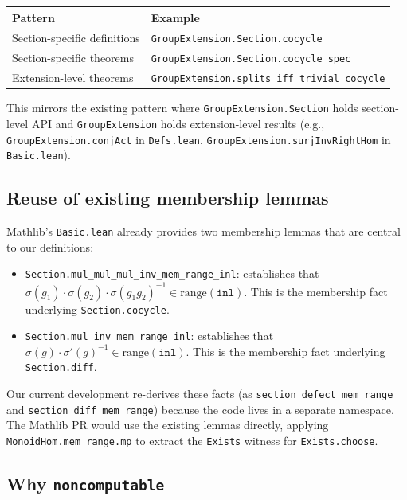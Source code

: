 \documentclass[11pt]{article}
\begin{document}
\begin{center}
\begin{tabular}{ll}
\toprule
\textbf{Pattern} & \textbf{Example} \\
\midrule
Section-specific definitions & \texttt{GroupExtension.Section.cocycle} \\
Section-specific theorems & \texttt{GroupExtension.Section.cocycle\_spec} \\
Extension-level theorems & \texttt{GroupExtension.splits\_iff\_trivial\_cocycle} \\
\bottomrule
\end{tabular}
\end{center}

This mirrors the existing pattern where \texttt{GroupExtension.Section} holds
section-level API and \texttt{GroupExtension} holds extension-level results (e.g.,
\texttt{GroupExtension.conjAct} in \texttt{Defs.lean},
\texttt{GroupExtension.surjInvRightHom} in \texttt{Basic.lean}).

\subsection{Reuse of existing membership lemmas}\label{sec:reuse}

Mathlib's \texttt{Basic.lean} already provides two membership lemmas that are central
to our definitions:

\begin{itemize}[nosep]
\item \texttt{Section.mul\_mul\_mul\_inv\_mem\_range\_inl}: establishes that
  $\sigma(g_1) \cdot \sigma(g_2) \cdot \sigma(g_1 g_2)^{-1} \in
  \mathrm{range}(\texttt{inl})$. This is the membership fact underlying
  \texttt{Section.cocycle}.

\item \texttt{Section.mul\_inv\_mem\_range\_inl}: establishes that
  $\sigma(g) \cdot \sigma'(g)^{-1} \in \mathrm{range}(\texttt{inl})$. This is the
  membership fact underlying \texttt{Section.diff}.
\end{itemize}

Our current development re-derives these facts (as \texttt{section\_defect\_mem\_range}
and \texttt{section\_diff\_mem\_range}) because the code lives in a separate namespace.
The Mathlib PR would use the existing lemmas directly, applying
\texttt{MonoidHom.mem\_range.mp} to extract the \texttt{Exists} witness for
\texttt{Exists.choose}.

\subsection{Why \texttt{noncomputable}}
\end{document}
